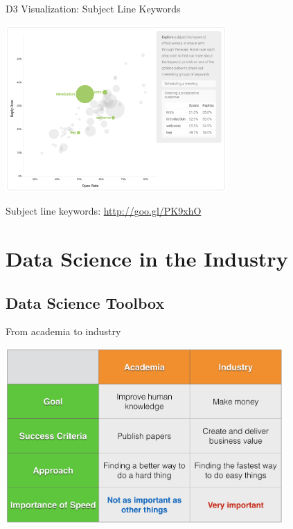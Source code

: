 \documentclass[10pt]{beamer}
\begin{document}
    \begin{frame}{D3 Visualization: Subject Line Keywords}
      \begin{center}
        \includegraphics[height=180pt]{../graphs/email_analysis_subject_line}
      \end{center}    
      \centerline{\footnotesize Subject line keywords: \url{http://goo.gl/PK9xhO}}
    \end{frame}

\section{Data Science in the Industry}

  \subsection{Data Science Toolbox}
  
    \begin{frame}{From academia to industry}
      \begin{center}
        \includegraphics[width=300pt]{../graphs/academia_industry}
      \end{center}
    \end{frame}
    
\end{document}
